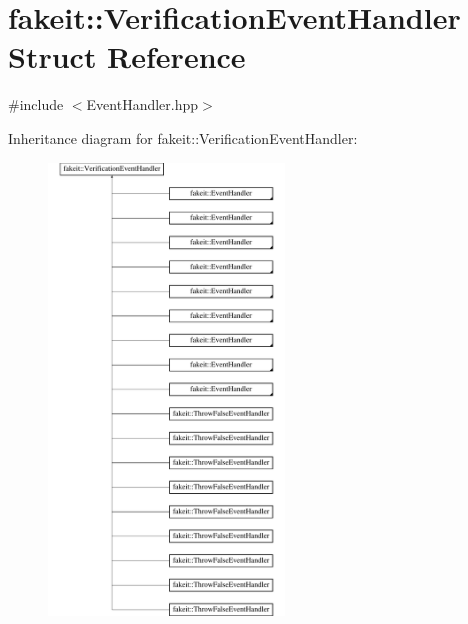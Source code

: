 \hypertarget{structfakeit_1_1VerificationEventHandler}{}\section{fakeit\+::Verification\+Event\+Handler Struct Reference}
\label{structfakeit_1_1VerificationEventHandler}


{\ttfamily \#include $<$Event\+Handler.\+hpp$>$}

Inheritance diagram for fakeit\+::Verification\+Event\+Handler\+:\begin{figure}[H]
\begin{center}
\leavevmode
\includegraphics[height=12.000000cm]{structfakeit_1_1VerificationEventHandler}
\end{center}
\end{figure}
